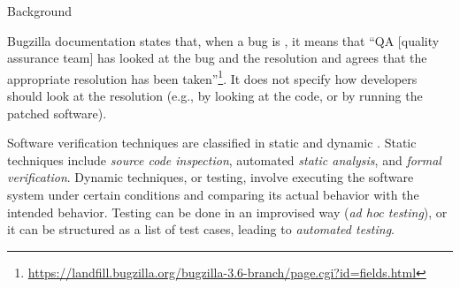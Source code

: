 \begin{section}{Background}



%
Bugzilla documentation states that, when a bug is \VERIFIED, it means that ``QA [quality assurance team] has looked at the bug and the resolution and agrees that the appropriate resolution has been taken''\footnote{\url{https://landfill.bugzilla.org/bugzilla-3.6-branch/page.cgi?id=fields.html}}. It does not specify how developers should look at the resolution (e.g., by looking at the code, or by running the patched software). 




Software verification techniques are classified in static and dynamic \cite{Sommerville1995}. Static techniques include \emph{source code inspection}, automated \emph{static analysis}, and \emph{formal verification}. Dynamic techniques, or testing, involve executing the software system under certain conditions and comparing its actual behavior with the intended behavior. Testing can be done in an improvised way (\emph{ad hoc testing}), or it can be structured as a list of test cases, leading to \emph{automated testing}.


\end{section}
